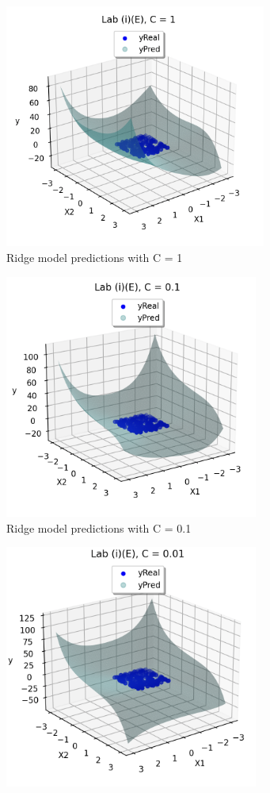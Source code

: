 \documentclass{article}
\begin{document}
\begin{figure}
\centering
\begin{subfigure}{.5\linewidth}
  \centering
  \includegraphics[width=\linewidth, height=8cm]{ie1.png}
  \caption{Ridge model predictions with C = 1}
  \label{fig:sub1}
\end{subfigure}%
\begin{subfigure}{.5\textwidth}
  \centering
  \includegraphics[width=\linewidth, height=8cm]{ie2.png}
  \caption{Ridge model predictions with C = 0.1}
  \label{fig:sub2}
\end{subfigure}
\label{fig:test}
\begin{subfigure}{.5\linewidth}
  \centering
  \includegraphics[width=\linewidth, height=8cm]{ie3.png}

\end{subfigure}
\end{figure}
\end{document}
